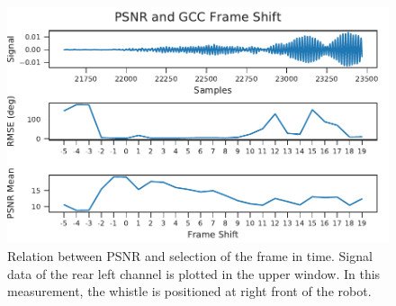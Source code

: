 \begin{figure}[ht]
	\centering
	\includegraphics[]{figures/evaluation/gcc_frame_shift}
	\caption{
		Relation between \ac{PSNR}
		and selection of the frame in time. Signal data
		of the rear left channel is plotted in the upper window.
		In this measurement, the whistle is positioned at right front
		of the robot.
	}
	\label{fig:04_psnr2FrameShift}
\end{figure}


